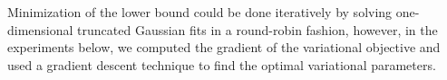 \documentclass[reqno,oneside,letterpaper,10pt]{article}
\newcommand{\Holder}{H\"older\xspace}
\newcommand{\dataset}{\mathcal{D}}
\newcommand{\diag}[1]{\mathop{\textrm{diag}}\left(#1\right)}
\newcommand{\normdist}{\mathcal{N}}
\newcommand{\s}{s}
\def\Indic#1{\mathbb{I}_{\{#1\}}}
\def\w{\mathbf{w}}
\def\u{\mathbf{u}}
\def\s{\mathbf{s}}
\def\v{\mathbf{v}}
\def\X{X}
\def\Z{Z}
\def\y{\mathbf{y}}
\def\eye{\mathbf{I}}
\def\bzeros{\mathbf{0}}
\def\proba{p}
\renewcommand{\Re}{\mathbb{R}}
\begin{document}
Minimization of the lower bound could be done iteratively by solving one-dimensional truncated Gaussian fits in a round-robin 
fashion, however, in the experiments below, we computed the gradient of the variational objective and used a 
gradient descent technique to find the optimal variational parameters. 


%
\end{document}
